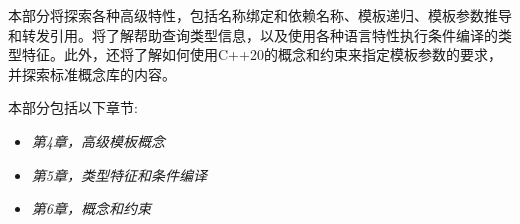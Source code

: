 本部分将探索各种高级特性，包括名称绑定和依赖名称、模板递归、模板参数推导和转发引用。将了解帮助查询类型信息，以及使用各种语言特性执行条件编译的类型特征。此外，还将了解如何使用C++20的概念和约束来指定模板参数的要求，并探索标准概念库的内容。

本部分包括以下章节:

\begin{itemize}
\item
\textit{第4章，高级模板概念}

\item
\textit{第5章，类型特征和条件编译}

\item
\textit{第6章，概念和约束}
\end{itemize}







